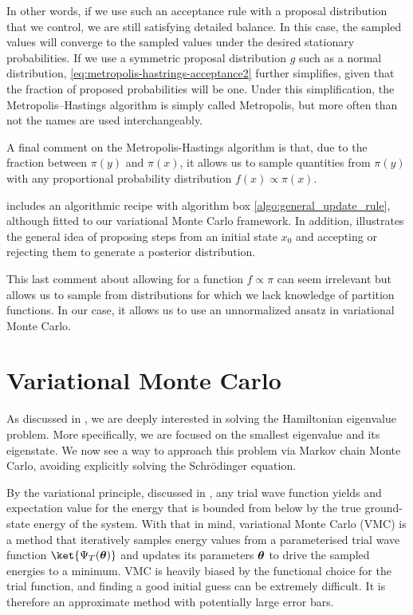 In other words, if we use such an acceptance rule with a proposal distribution that we control, we are still satisfying detailed balance. In this case, the sampled values will converge to the sampled values under the desired stationary probabilities. If we use a symmetric proposal distribution $g$ such as a normal distribution, \eqref{eq:metropolis-hastrings-acceptance2} further simplifies, given that the fraction of proposed probabilities will be one. Under this simplification, the Metropolis–Hastings algorithm is simply called Metropolis, but more often than not the names are used interchangeably.

A final comment on the Metropolis-Hastings algorithm is that, due to the fraction between $\pi(y)$ and $\pi(x)$, it allows us to sample quantities from $\pi(y)$ with any proportional probability distribution $f(x) \propto \pi(x)$. 

 includes an algorithmic recipe with algorithm box \ref{algo:general_update_rule}, although fitted to our variational Monte Carlo framework. In addition,  illustrates the general idea of proposing steps from an initial state $x_0$ and accepting or rejecting them to generate a posterior distribution. 

\begin{JTD}
This last comment about allowing for a function $f \propto \pi$ can seem irrelevant but allows us to sample from distributions for which we lack knowledge of partition functions. In our case, it allows us to use an unnormalized ansatz in variational Monte Carlo. 
\end{JTD}

\section{Variational Monte Carlo}\label{sec:VMC}
As discussed in , we are deeply interested in solving the Hamiltonian eigenvalue problem. More specifically, we are focused on the smallest eigenvalue and its eigenstate. We now see a way to approach this problem via Markov chain Monte Carlo, avoiding explicitly solving the Schrödinger equation.

By the variational principle, discussed in , any trial wave function yields and expectation value for the energy that is bounded from below by the true ground-state energy of the system. With that in mind, variational Monte Carlo (VMC) is a method that iteratively samples energy values from a parameterised trial wave function $\ket{\Psi_T(\mvec{\theta}) }$ and updates its parameters $\boldsymbol{\theta}$ to drive the sampled energies to a minimum. VMC is heavily biased by the functional choice for the trial function, and finding a good initial guess can be extremely difficult. It is therefore an approximate method with potentially large error bars. 

